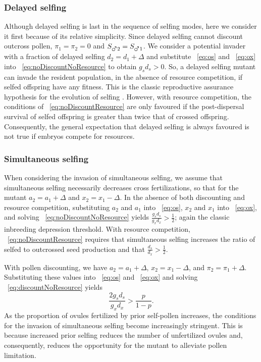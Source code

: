 \documentclass[letterpaper,titlepage]{scrartcl}
\begin{document}
\subsubsection{Delayed selfing}
Although delayed selfing is last in the sequence of selfing modes,
here we consider it first because of its relative simplicity. Since
delayed selfing cannot discount outcross pollen, $\pi_{1}=\pi_{2}=0$
and $S_{\mars2}=S_{\mars1}$. We consider a potential invader with a
fraction of delayed selfing $d_{2}=d_{1}+\Delta$ and substitute
{\eref}~\eqref{eq:os} and {\eref}~\eqref{eq:ox} into
{\eref}~\eqref{eq:noDiscountNoResource} to obtain $g_{s}d_{s}>0$. So, a
delayed selfing mutant can invade the resident population, in the
absence of resource competition, if selfed offspring have any
fitness. This is the classic reproductive assurance hypothesis for the
evolution of selfing \citep{Darwin76,Herlihy02}. However, with
resource competition, the conditions of
{\eref}~\eqref{eq:noDiscountResource} are only favoured if the
post-dispersal survival of selfed offspring is greater than twice that
of crossed offspring. Consequently, the general expectation that
delayed selfing is always favoured \citep{Lloyd79} is not true if
embryos compete for resources.

\subsubsection{Simultaneous selfing}
When considering the invasion of simultaneous selfing, we assume that
simultaneous selfing necessarily decreases cross fertilizations, so
that for the mutant $a_{2}=a_{1}+\Delta$ and $x_{2}=x_{1}-\Delta$. In
the absence of both discounting and resource competition, substituting
$a_{2}$ and $a_{1}$ into {\eref}~\eqref{eq:os}, $x_{2}$ and $x_{1}$ into
{\eref}~\eqref{eq:ox}, and solving {\eref}~\eqref{eq:noDiscountNoResource}
yields $\frac{g_{s}d_{s}}{g_{x}d_{x}}>\frac{1}{2}$; again the classic
inbreeding depression threshold. With resource competition,
{\eref}~\eqref{eq:noDiscountResource} requires that simultaneous selfing
increases the ratio of selfed to outcrossed seed production and that
$\frac{d_{s}}{d_{x}}>\frac{1}{2}$.

With pollen discounting, we have $a_{2}=a_{1}+\Delta$,
$x_{2}=x_{1}-\Delta$, and $\pi_{2}=\pi_{1}+\Delta$. Substituting these
values into {\eref}~\eqref{eq:os} and {\eref}~\eqref{eq:ox} and solving
{\eref}~\eqref{eq:discountNoResource} yields
\begin{equation*}
  \frac{2g_{s}d_{s}}{g_{x}d_{x}}>\frac{p}{1-p}.
\end{equation*}
As the proportion of ovules fertilized by prior self-pollen
increases, the conditions for the invasion of simultaneous selfing become
increasingly stringent. This is because increased prior selfing
reduces the number of unfertilized ovules and, consequently, reduces
the opportunity for the mutant to alleviate pollen limitation.
\end{document}
